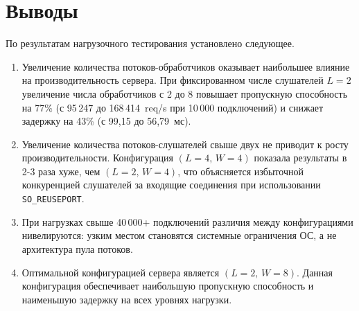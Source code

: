 \section{Выводы}
По результатам нагрузочного тестирования установлено следующее.

\begin{enumerate}
	\item Увеличение количества потоков-обработчиков оказывает
	наибольшее влияние на производительность сервера.
	При фиксированном числе слушателей $L{=}2$ увеличение
	числа обработчиков с 2 до 8 повышает пропускную способность
	на 77\% (с 95\,247 до 168\,414~req/s при 10\,000 подключений)
	и снижает задержку на 43\% (с 99,15 до 56,79~мс).

	\item Увеличение количества потоков-слушателей
	свыше двух не приводит к росту производительности.
	Конфигурация $(L{=}4,\,W{=}4)$ показала результаты
	в 2-3 раза хуже, чем $(L{=}2,\,W{=}4)$,
	что объясняется избыточной конкуренцией слушателей
	за входящие соединения при использовании \texttt{SO\_REUSEPORT}.

	\item При нагрузках свыше 40\,000+ подключений
	различия между конфигурациями нивелируются:
	узким местом становятся системные ограничения ОС,
	а не архитектура пула потоков.

	\item Оптимальной конфигурацией сервера
	является $(L{=}2,\,W{=}8)$.
	Данная конфигурация обеспечивает наибольшую пропускную
	способность и наименьшую задержку на всех
	уровнях нагрузки.
\end{enumerate}
